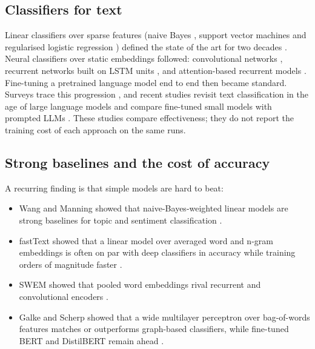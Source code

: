 \documentclass{ijis}
\begin{document}
\subsection{Classifiers for text}

Linear classifiers over sparse features (naive Bayes \cite{mccallum1998comparison}, support vector machines \cite{joachims1998text} and regularised logistic regression \cite{genkin01082007}) defined the state of the art for two decades \cite{sebastiani2002machine}. Neural classifiers over static embeddings followed: convolutional networks \cite{yoon2014convolutional,zhang2015character}, recurrent networks built on LSTM units \cite{hochreiterlong}, and attention-based recurrent models \cite{liuguo2019bidirectional}. Fine-tuning a pretrained language model end to end \cite{howard2018universal,devlin-etal-2019-bert,sun2019fine} then became standard. Surveys trace this progression \cite{kowsari2019text,minaee2021deep,li2022survey,qiu2020pre}, and recent studies revisit text classification in the age of large language models \cite{trust2024study} and compare fine-tuned small models with prompted LLMs \cite{bucher2024fine,edwards2024language}. These studies compare effectiveness; they do not report the training cost of each approach on the same runs.

\subsection{Strong baselines and the cost of accuracy}

A recurring finding is that simple models are hard to beat:
\begin{itemize}
\setlength\itemsep{1pt}
\item Wang and Manning showed that naive-Bayes-weighted linear models are strong baselines for topic and sentiment classification \cite{wang2012baselines}.
\item fastText showed that a linear model over averaged word and n-gram embeddings is often on par with deep classifiers in accuracy while training orders of magnitude faster \cite{joulin-etal-2017-bag}.
\item SWEM showed that pooled word embeddings rival recurrent and convolutional encoders \cite{shen2018baseline}.
\item Galke and Scherp showed that a wide multilayer perceptron over bag-of-words features matches or outperforms graph-based classifiers, while fine-tuned BERT and DistilBERT remain ahead \cite{galke2022bag}.
\end{itemize}
\end{document}
